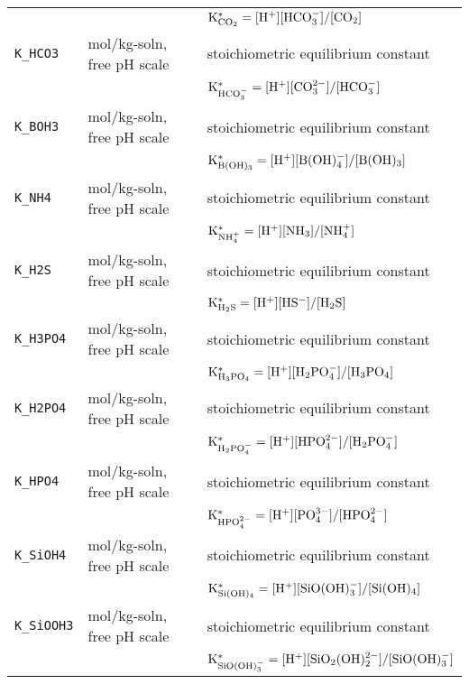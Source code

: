 \documentclass[article,nojss]{jss}
\begin{document}
\begin{footnotesize}
\begin{longtable}{l|l|p{7cm}}
            &                                 & $\rm K^*_{CO_2} = [H^+][HCO_3^{-}] / [CO_2]$\\
\texttt{K\_HCO3}     &mol/kg-soln,       free pH scale & stoichiometric equilibrium constant \\
            &                                 & $\rm K^*_{HCO_3^{-}} = [H^+][CO_3^{2-}] / [HCO_3^{-}]$\\
\texttt{K\_BOH3}     &mol/kg-soln,       free pH scale & stoichiometric equilibrium constant\\
            &                                 & $\rm K^*_{B(OH)_3} = [H^+][B(OH)_4^-] / [B(OH)_3]$\\          
\texttt{K\_NH4}      &mol/kg-soln,       free pH scale & stoichiometric equilibrium constant\\
            &                                 & $\rm K^*_{NH_4^+} = [H^+][NH_3] / [NH_4^+]$\\
\texttt{K\_H2S}      &mol/kg-soln,       free pH scale & stoichiometric equilibrium constant \\
            &                                 & $\rm K^*_{H_2S} = [H^+][HS^-] / [H_2S]$\\
\texttt{K\_H3PO4}    &mol/kg-soln,       free pH scale & stoichiometric equilibrium constant\\
            &                                 & $\rm K^*_{H_3PO_4} = [H^+][H_2PO_4^-] / [H_3PO_4]$\\         
\texttt{K\_H2PO4}    &mol/kg-soln,       free pH scale & stoichiometric equilibrium constant\\
            &                                 & $\rm K^*_{H_2PO_4^-} = [H^+][HPO_4^{2-}] / [H_2PO_4^-]$\\
\texttt{K\_HPO4}     &mol/kg-soln,       free pH scale & stoichiometric equilibrium constant\\
            &                                 & $\rm K^*_{HPO_4^{2-}} = [H^+][PO_4^{3-}] / [HPO_4^{2-}]$\\
\texttt{K\_SiOH4}    &mol/kg-soln,       free pH scale & stoichiometric equilibrium constant\\
            &                                 & $\rm K^*_{Si(OH)_4} = [H^+][SiO(OH)_3^-] / [Si(OH)_4]$\\         
\texttt{K\_SiOOH3}   &mol/kg-soln,       free pH scale & stoichiometric equilibrium constant\\
            &                                 & $\rm K^*_{SiO(OH)_3^-} = [H^+][SiO_2(OH)_2^{2-}] / [SiO(OH)_3^-]$\\         

\end{longtable}
\end{footnotesize}
\end{document}
